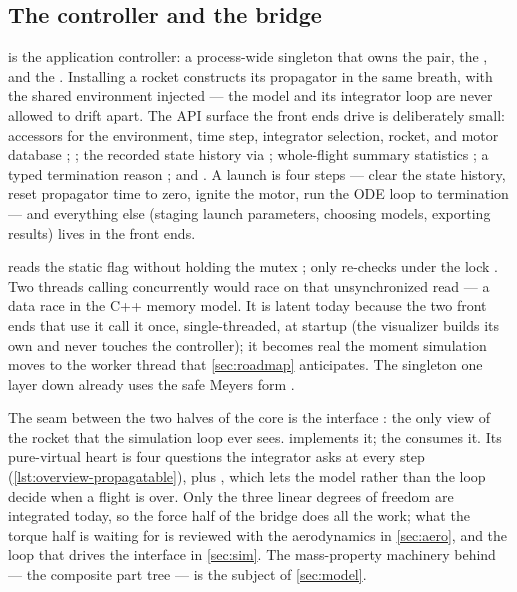 \subsection{The controller and the  bridge}\label{sec:overview-controller}

 is the application controller: a process-wide singleton
 that owns the  pair, the
, and the . Installing a rocket constructs its
propagator in the same breath, with the shared environment injected
 --- the model and its integrator loop are never allowed to drift apart.
The API surface the front ends drive is deliberately small: accessors for the environment,
time step, integrator selection, rocket, and motor database ;
 ; the recorded state history via
 ; whole-flight summary statistics
; a typed termination reason ; and
 . A launch is four steps --- clear the state
history, reset propagator time to zero, ignite the motor, run the ODE loop to termination
 --- and everything else (staging launch parameters, choosing models,
exporting results) lives in the front ends.

\begin{keyinsight}
 reads the static  flag without holding the
mutex ; only  re-checks under the lock
. Two threads calling  concurrently would race on
that unsynchronized read --- a data race in the C++ memory model. It is latent today because
the two front ends that use it call it once, single-threaded, at startup (the visualizer
builds its own  and never touches the controller); it becomes real the
moment simulation moves to the worker thread that \cref{sec:roadmap} anticipates. The
 singleton one layer down already uses the safe Meyers form
.
\end{keyinsight}

The seam between the two halves of the core is the  interface
: the only view of the rocket that the simulation loop ever
sees.  implements it; the  consumes it. Its pure-virtual
heart is four questions the integrator asks at every step
(\cref{lst:overview-propagatable}), plus 
, which lets the model rather than the loop decide when a
flight is over. Only the three linear degrees of freedom are integrated today, so the force
half of the bridge does all the work; what the torque half is waiting for is reviewed with
the aerodynamics in \cref{sec:aero}, and the loop that drives the interface in
\cref{sec:sim}. The mass-property machinery behind  --- the composite part
tree --- is the subject of \cref{sec:model}.

